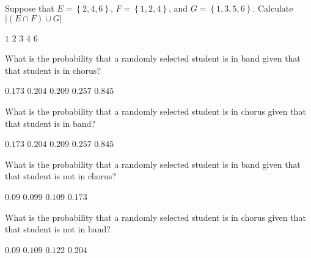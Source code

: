 \documentclass[answers,12pt]{exam}
\begin{document}
\begin{questions}
\question Suppose that $E=\left\{2,4,6\right\}$,
$F=\left\{1,2,4\right\}$, and $G=\left\{1,3,5,6\right\}$.
Calculate $\left|\left(E\cap F\right)\cup G\right|$\\
\begin{oneparchoices}
\choice $1$
\choice $2$
\choice $3$
\choice $4$
\correctchoice $6$
\end{oneparchoices}


\question\label{FirstAmes} What is the probability that a randomly selected
student is in band given that that student is in chorus?\\
\begin{oneparchoices}
\correctchoice $0.173$ 
\choice $0.204$ %
\choice $0.209$ %
\choice $0.257$ %
\choice $0.845$ %
\end{oneparchoices}

\question\label{FirstAmes} What is the probability that a randomly selected
student is in chorus given that that student is in band?\\
\begin{oneparchoices}
\choice $0.173$ %
\correctchoice $0.204$
\choice $0.209$ %
\choice $0.257$ %
\choice $0.845$ %
\end{oneparchoices}

\question\label{LastAmes} What is the probability that a randomly selected
student is in band given that that student is not in chorus?\\
\begin{oneparchoices}
\correctchoice $0.09$
\choice $0.099$ %
\choice %
\choice $0.109$ %
\choice $0.173$ %
\end{oneparchoices}

\question\label{LastAmes} What is the probability that a randomly selected
student is in chorus given that that student is not in band?\\
\begin{oneparchoices}
\choice $0.09$ %
\correctchoice $0.109$
\choice $0.122$ %
\choice %
\choice $0.204$ %
\end{oneparchoices}


\end{questions}
\end{document}
